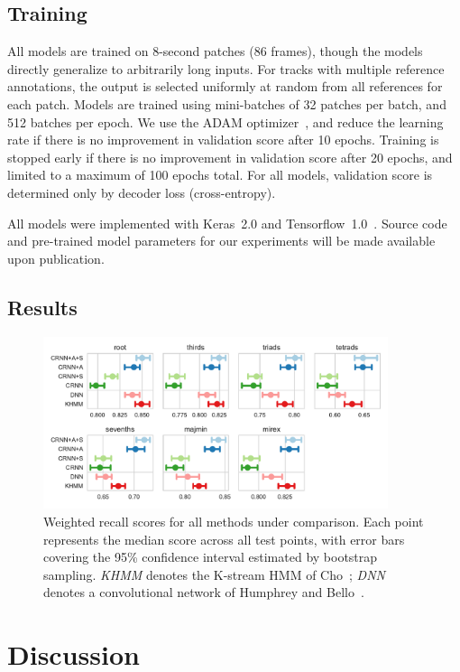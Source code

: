 \documentclass{article}
\begin{document}
\subsection{Training}
All models are trained on 8-second patches (86 frames), though the models directly generalize to arbitrarily long inputs.
For tracks with multiple reference annotations, the output is selected uniformly at random from all references for each patch.
Models are trained using mini-batches of 32 patches per batch, and 512 batches per epoch.
We use the ADAM optimizer~\cite{kingma2014adam}, and reduce the learning rate if there is no improvement in validation score after 10 epochs.
Training is stopped early if there is no improvement in validation score after 20 epochs, and limited to a maximum of 100 epochs total.
For all models, validation score is determined only by decoder loss (cross-entropy).


All models were implemented with Keras~2.0 and Tensorflow~1.0~\cite{chollet2015keras, tensorflow2015-whitepaper}.
Source code and pre-trained model parameters for our experiments will be made available upon publication.

\subsection{Results}

\begin{figure}[t]
    \centering
    \includegraphics[width=0.9\textwidth]{crnn-scores}
    \caption{Weighted recall scores for all methods under comparison.  Each point represents the median score across all test points, with error bars covering the 95\% confidence interval estimated by bootstrap sampling.
        \emph{KHMM} denotes the K-stream HMM of Cho~\cite{cho2014improved}; \emph{DNN} denotes a convolutional network of Humphrey and Bello~\cite{humphrey2015four}.\label{fig:results}}
\end{figure}
\section{Discussion}



\end{document}
